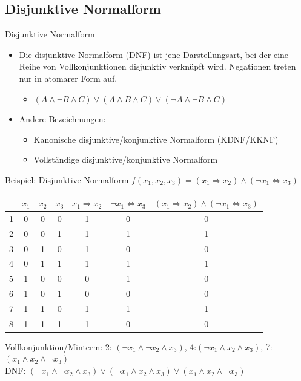 \documentclass[12pt%
,aspectratio=169%
]{beamer}
\begin{document}
\subsection{Disjunktive Normalform}
\begin{frame}{Disjunktive Normalform}
\begin{itemize}
	\item Die disjunktive Normalform (DNF) ist jene Darstellungsart, bei der eine Reihe von Vollkonjunktionen disjunktiv verknüpft wird. Negationen  treten nur in atomarer Form auf.
	\begin{itemize}
		\item $(A \land \neg B \land C) \lor (A \land B \land C) \lor (\neg A \land \neg B \land C)$ 
	\end{itemize}
	\item Andere Bezeichnungen:
	\begin{itemize}
		\item Kanonische disjunktive/konjunktive Normalform (KDNF/KKNF)
		\item Vollständige disjunktive/konjunktive Normalform
	\end{itemize}
\end{itemize}
\end{frame}

\begin{frame}{Beispiel: Disjunktive Normalform}
$f(x_1, x_2, x_3) = (x_1 \Rightarrow x_2) \land (\neg x_1 \Leftrightarrow x_3)$
\begin{table}[]
\begin{tabular}{|c|c|c|c||c|c|c|}
\hline
 & $x_1$ & $x_2$ & $x_3$ & $x_1 \Rightarrow x_2$ & \textbf{$\neg x_1 \Leftrightarrow x_3$} & \textbf{$(x_1 \Rightarrow x_2) \land (\neg x_1 \Leftrightarrow x_3)$} \\ \hline
1 & 0 & 0 & 0 & 1 & 0 & 0 \\ \hline
2 & 0 & 0 & 1 & 1 & 1 & 1 \\ \hline
3 & 0 & 1 & 0 & 1 & 0 & 0 \\ \hline
4 & 0 & 1 & 1 & 1 & 1 & 1 \\ \hline
5 & 1 & 0 & 0 & 0 & 1 & 0 \\ \hline
6 & 1 & 0 & 1 & 0 & 0 & 0 \\ \hline
7 & 1 & 1 & 0 & 1 & 1 & 1 \\ \hline
8 & 1 & 1 & 1 & 1 & 0 & 0 \\ \hline
\end{tabular}
\end{table}
Vollkonjunktion/Minterm: 2: $(\neg x_1 \land \neg x_2 \land x_3)$, 4:$(\neg x_1 \land x_2 \land x_3)$, 7:$(x_1 \land x_2 \land \neg x_3)$ \\
DNF: $(\neg x_1 \land \neg x_2 \land x_3) \lor (\neg x_1 \land x_2 \land x_3) \lor (x_1 \land x_2 \land \neg x_3)$
\end{frame}
\end{document}
